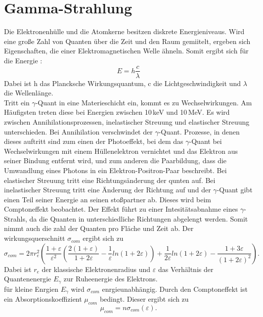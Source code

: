 \section{Gamma-Strahlung}
Die Elektronenhülle und die Atomkerne besitzen diskrete Energieniveaus.
Wird eine große Zahl von Quanten über die Zeit und den Raum gemiitelt, ergeben sich Eigenschaften,
die einer Elektromagnetischen Welle ähneln.
Somit ergibt sich für die Energie :
\begin{equation}
  E = h\frac{c}{\lambda}
\end{equation}
Dabei ist h das Plancksche Wirkungsquantum, c die Lichtgeschwindigkeit und $\lambda$ die Wellenlänge.\\
Tritt ein $\gamma$-Quant in eine Materieschicht ein, kommt es zu Wechselwirkungen.
Am Häufigsten treten diese bei Energien zwischen 10\,keV und 10\,MeV.
Es wird zwischen Annihilationsprozessen, inelastischer Streuung und elastischer Streuung unterschieden.
Bei Annihilation verschwindet der $\gamma$-Quant.
Prozesse, in denen dieses auftritt sind zum einen der Photoeffekt,
 bei dem das $\gamma$-Quant bei Wechselwirkungen mit einem Hüllenelektron vernichtet und das Elektron aus seiner Bindung entfernt wird,
  und zum anderen die Paarbildung,
 dass die Umwandlung eines Photons in ein Elektron-Positron-Paar beschreibt.
 Bei elastischer Streuung tritt eine Richtungsänderung der qunten auf.
Bei inelastischer Streuung tritt eine Änderung der Richtung auf
und der $\gamma$-Quant gibt einen Teil seiner Energie an seinen stoßpartner ab.
Dieses wird beim Comptoneffekt beobachtet.
Der Effekt führt zu einer Intesitätsabnahme eines $\gamma$-Strahls, da die Quanten in unterschiedliche Richtungen abgelengt werden.
Somit nimmt auch die zahl der Quanten pro Fläche und Zeit ab.
Der wirkungsquerschnitt $\sigma_{com}$ ergibt sich zu
\begin{equation}
  \sigma_{com} = 2\pi r_e^2\left(\frac{1 + \varepsilon}{\varepsilon^2}\left(\frac{2(1+\varepsilon)}{1+2\varepsilon}-\frac{1}{\varepsilon}
  ln(1+2\varepsilon)\right)+\frac{1}{2\varepsilon}ln(1+2\varepsilon)-\frac{1+3\varepsilon}{(1+2\varepsilon)^2}\right).
  \label{eqn:sigma}
\end{equation}
Dabei ist $r_e$ der klassische Elektronenradius und $\varepsilon$ das Verhältnis der Quantenenergie $E_{\gamma}$ zur Ruheenergie des Elektrons.\\
für kleine Enrgien $E_{\gamma}$ wird $\sigma_{com}$ enrgieunabhängig.
Durch den Comptoneffekt ist ein Absorptionskoeffizient $\mu_{com}$ bedingt.
Dieser ergibt sich zu
\begin{equation}
  \mu_{com} = n \sigma_{com}(\varepsilon) .
  \label{eqn:absorption}
\end{equation}

